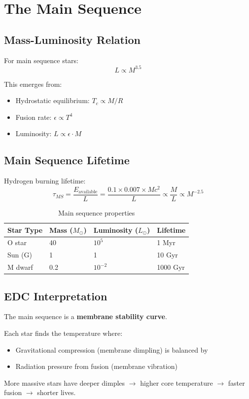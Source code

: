 \documentclass[12pt,a4paper]{article}
\newcommand{\Msun}{M_\odot}
\newcommand{\Lsun}{L_\odot}
\begin{document}
\section{The Main Sequence}

\subsection{Mass-Luminosity Relation}

For main sequence stars:
\begin{equation}
L \propto M^{3.5}
\end{equation}

This emerges from:
\begin{itemize}
    \item Hydrostatic equilibrium: $T_c \propto M/R$
    \item Fusion rate: $\epsilon \propto T^4$
    \item Luminosity: $L \propto \epsilon \cdot M$
\end{itemize}

\subsection{Main Sequence Lifetime}

Hydrogen burning lifetime:
\begin{equation}
\tau_{MS} = \frac{E_{\text{available}}}{L} = \frac{0.1 \times 0.007 \times M c^2}{L} \propto \frac{M}{L} \propto M^{-2.5}
\end{equation}

\begin{table}[H]
\centering
\begin{tabular}{@{}llll@{}}
\toprule
\textbf{Star Type} & \textbf{Mass} ($\Msun$) & \textbf{Luminosity} ($\Lsun$) & \textbf{Lifetime} \\
\midrule
O star & 40 & $10^5$ & 1 Myr \\
Sun (G) & 1 & 1 & 10 Gyr \\
M dwarf & 0.2 & $10^{-2}$ & 1000 Gyr \\
\bottomrule
\end{tabular}
\caption{Main sequence properties}
\end{table}

\subsection{EDC Interpretation}

\begin{insight}
The main sequence is a \textbf{membrane stability curve}.

Each star finds the temperature where:
\begin{itemize}
    \item Gravitational compression (membrane dimpling) is balanced by
    \item Radiation pressure from fusion (membrane vibration)
\end{itemize}

More massive stars have deeper dimples $\to$ higher core temperature $\to$ faster fusion $\to$ shorter lives.
\end{insight}
\end{document}
